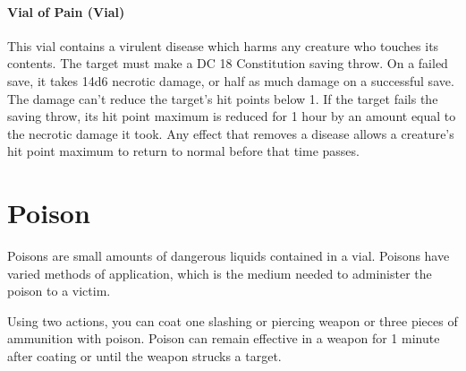     \paragraph{Vial of Pain (Vial)} %
        This vial contains a virulent disease which harms any creature who touches its contents.
        The target must make a DC 18 Constitution saving throw.
        On a failed save, it takes 14d6 necrotic damage, or half as much damage on a successful save.
        The damage can't reduce the target's hit points below 1.
        If the target fails the saving throw, its hit point maximum is reduced for 1 hour by an amount equal to the necrotic damage it took.
        Any effect that removes a disease allows a creature's hit point maximum to return to normal before that time passes.
\newpage

\section*{Poison}
    Poisons are small amounts of dangerous liquids contained in a vial.
    Poisons have varied methods of application, which is the medium needed to administer the poison to a victim.

    Using two actions, you can coat one slashing or piercing weapon or three pieces of ammunition with poison.
    Poison can remain effective in a weapon for 1 minute after coating or until the weapon strucks a target.

